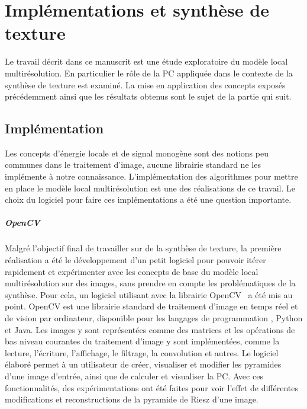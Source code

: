 \chapter{Implémentations et synthèse de texture}
\label{chap:chapitre2}

Le travail décrit dans ce manuscrit est une étude exploratoire du modèle local multirésolution. En particulier le rôle de la PC appliquée dans le contexte de la synthèse de texture est examiné. La mise en application des concepts exposés précédemment ainsi que les résultats obtenus sont le sujet de la partie qui suit.

\section{Implémentation}

Les concepts d'énergie locale et de signal monogène sont des notions peu communes dans le traitement d'image, aucune librairie standard ne les implémente à notre connaissance. L'implémentation des algorithmes pour mettre en place le modèle local multirésolution est une des réalisations de ce travail. Le choix du logiciel pour faire ces implémentations a été une question importante.


\paragraph{OpenCV}

Malgré l'objectif final de travailler sur de la synthèse de texture, la première réalisation a été le développement d'un petit logiciel pour pouvoir itérer rapidement et expérimenter avec les concepts de base du modèle local multirésolution sur des images, sans prendre en compte les problématiques de la synthèse. Pour cela, un logiciel utilisant \cpp avec la librairie OpenCV~\cite{opencv_library} a été mis au point. OpenCV est une librairie standard de traitement d'image en temps réel et de vision par ordinateur, disponible pour les langages de programmation \cpp, Python et Java. Les images y sont représentées comme des matrices et les opérations de bas niveau courantes du traitement d'image y sont implémentées, comme la lecture, l'écriture, l'affichage, le filtrage, la convolution et autres. Le logiciel élaboré permet à un utilisateur de créer, visualiser et modifier les pyramides d'une image d'entrée, ainsi que de calculer et visualiser la PC. Avec ces fonctionnalités, des expérimentations ont été faites pour voir l'effet de différentes modifications et reconstructions de la pyramide de Riesz d'une image.

